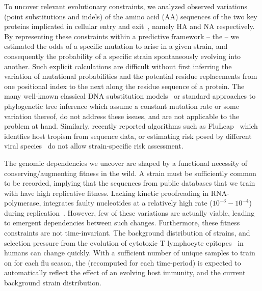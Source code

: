 \documentclass[onecolumn, compsoc,10pt]{IEEEtran}
\begin{document}
To uncover relevant evolutionary constraints, we analyzed observed variations (point substitutions and indels) of the  amino acid (AA)  sequences  of the two key proteins implicated  in cellular entry and exit~\cite{gamblin2010influenza,shao2017evolution}, namely HA and NA respectively. By representing these constraints within a predictive framework -- the \enet -- we estimated the  odds of a specific mutation to arise in a given strain, and consequently the probability of a specific strain spontaneously  evolving into another.  Such explicit calculations are difficult  without first inferring the %
variation of mutational probabilities and the potential residue replacements from one positional index to the next along the residue sequence of a protein. The many well-known classical  DNA  substitution models~\cite{posada1998modeltest} or standard approaches to phylogenetic tree inference which assume a constant mutation rate or some variation thereof, do not address these issues, and are not applicable to the problem at hand. Similarly, recently reported algorithms such  as FluLeap~\cite{eng2014predicting}  which identfies host tropism from sequence data, or estimating risk posed by different viral species~\cite{grange2021ranking} do not allow strain-specific risk assessment.

The genomic dependencies we uncover are shaped by  a  functional necessity of conserving/augmenting  fitness in the wild. A  strain must be sufficiently common  to be recorded, implying that the sequences from public databases that we train  with have  high replicative fitness. Lacking kinetic proofreading  in  RNA-polymerase,  \infl integrates  faulty nucleotides   at a relatively high rate ($10^{-3}-10^{-4}$) during  replication~\cite{ahlquist2002rna,chen2006avian}. However, few   of these variations are actually viable, %
leading to emergent dependencies between such changes. Furthermore, these fitness constraints are not time-invariant. The background distribution of strains, and selection pressure from the evolution of cytotoxic T lymphocyte  epitopes~\cite{woolthuis2016long,fan2012role,van2016differential,berkhoff2007assessment,van2012evasion} in humans can change quickly. With a sufficient number of unique samples to train on for each flu season, the \enet (recomputed for each time-period) is expected to  %
automatically reflect the effect of an evolving host immunity, and the current background strain distribution.  
\end{document}
